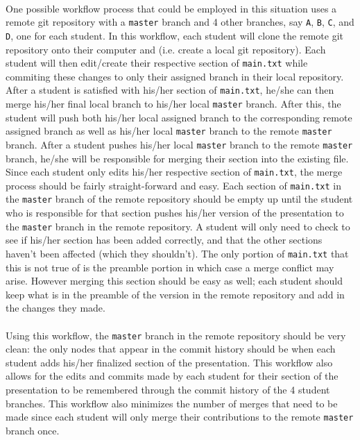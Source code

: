 \documentclass[12pt]{article}
\begin{document}
\paragraph{} One possible workflow process that could be employed in this situation uses a remote git repository with a \texttt{master} branch and 4 other branches, say \texttt{A}, \texttt{B}, \texttt{C}, and \texttt{D}, one for each student. In this workflow, each student will clone the remote git repository onto their computer and (i.e. create a local git repository). Each student will then edit/create their respective section of \texttt{main.txt} while commiting these changes to only their assigned branch in their local repository. After a student is satisfied with his/her section of \texttt{main.txt}, he/she can then merge his/her final local branch to his/her local \texttt{master} branch. After this, the student will push both his/her local assigned branch to the corresponding remote assigned branch as well as his/her local \texttt{master} branch to the remote \texttt{master} branch. After a student pushes his/her local \texttt{master} branch to the remote \texttt{master} branch, he/she will be responsible for merging their section into the existing file. Since each student only edits his/her respective section of \texttt{main.txt}, the merge process should be fairly straight-forward and easy. Each section of \texttt{main.txt} in the \texttt{master} branch of the remote repository should be empty up until the student who is responsible for that section pushes his/her version of the presentation to the \texttt{master} branch in the remote repository. A student will only need to check to see if his/her section has been added correctly, and that the other sections haven't been affected (which they shouldn't). The only portion of \texttt{main.txt} that this is not true of is the preamble portion in which case a merge conflict may arise. However merging this section should be easy as well; each student should keep what is in the preamble of the version in the remote repository and add in the changes they made. 

\paragraph{}Using this workflow, the \texttt{master} branch in the remote repository should be very clean: the only nodes that appear in the commit history should be when each student adds his/her finalized section of the presentation. This workflow also allows for the edits and commits made by each student for their section of the presentation to be remembered through the commit history of the 4 student branches. This workflow also minimizes the number of merges that need to be made since each student will only merge their contributions to the remote \texttt{master} branch once.
\end{document}
